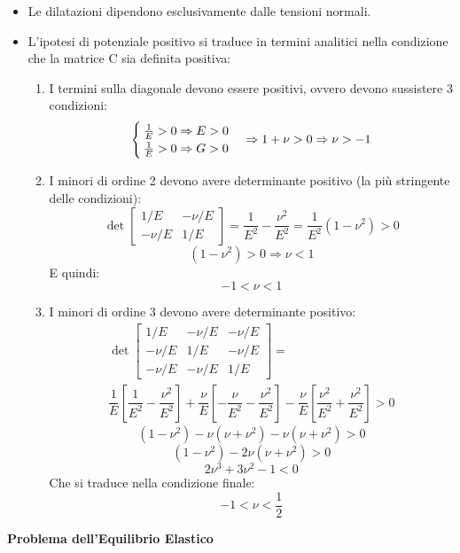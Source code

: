 \documentclass{article}
\begin{document}
\begin{adjustwidth}{2in}{}
\begin{itemize}
		\item Le dilatazioni dipendono esclusivamente dalle tensioni normali.
		
		\item L’ipotesi di potenziale positivo si traduce in termini analitici nella condizione che la matrice
		C sia definita positiva:
		\begin{enumerate}
			\item I termini sulla diagonale devono essere positivi, ovvero devono sussistere 3 condizioni:
			\[
			\begin{cases}
				{1\over E}>0\Rightarrow E>0\\ {1\over E}>0 \Rightarrow  G>0
			\end{cases} \Rightarrow 1+\nu >0 \Rightarrow \nu >-1
			\] 
			
			\item I minori di ordine 2 devono avere determinante positivo (la più stringente delle condizioni):
			\[			
			\det\left[ \begin{array}{cc}
				1/E & -\nu/E \\
				-\nu/E & 1/E
			\end{array}\right] =  \dfrac{1}{E^2} - \dfrac{\nu^2}{E^2} = \dfrac{1}{E^2}(1-\nu^2) >0			
			\]
			\[
			(1-\nu^2) >0 \Rightarrow \nu<1
			\]
			E quindi:
			\[ -1<\nu<1\]
			\item I minori di ordine 3 devono avere determinante positivo:
			\[
			\begin{split}
				\det\left[ \begin{array}{ccc}
				1/E & -\nu/E & -\nu/E \\
				-\nu/E & 1/E & -\nu/E \\
				-\nu/E & -\nu/E & 1/E
			\end{array}\right] = \\ \dfrac{1}{E}\left[\dfrac{1}{E^2} - \dfrac{\nu^2}{E^2} \right] + \dfrac{\nu}{E}\left[-\dfrac{\nu}{E^2} - \dfrac{\nu^2}{E^2} \right]  - \dfrac{\nu}{E}\left[\dfrac{\nu^2}{E^2} + \dfrac{\nu^2}{E^2} \right]  >0
			\end{split}
			\]
			\[
			(1-\nu^2) - \nu(\nu+\nu^2) -\nu(\nu+\nu^2) >0
			\]
			\[
			(1-\nu^2) - 2\nu(\nu+\nu^2)  >0
			\]
			\[
			2\nu^3 + 3\nu^2 - 1 <0 
			\]
			Che si traduce nella condizione finale: 
			\[ -1<\nu<\dfrac{1}{2} \]
		\end{enumerate}
	\end{itemize}

\newpage 
	
{\Large \textbf{Problema dell'Equilibrio Elastico}} \mbox{} \newline


\end{adjustwidth}
\end{document}
